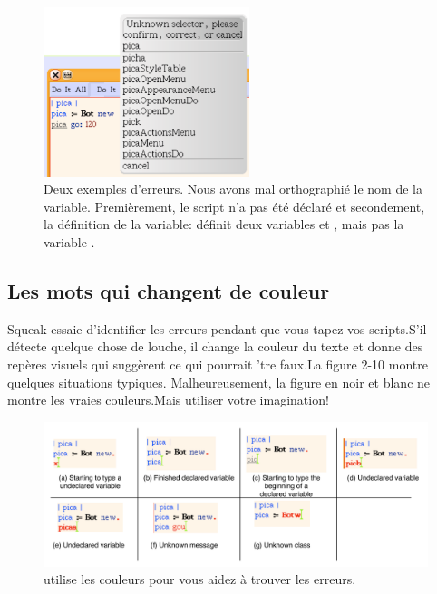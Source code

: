 \documentclass[a4paper,10pt,twoside]{book}
\begin{document}
\begin{figure}[h!]
\begin{center}\includegraphics[width=6cm]{periodMissing}
\caption{Deux exemples d'erreurs. Nous avons mal orthographi\'e le nom de la variable. Premi\`erement, le script  n'a pas \'et\'e d\'eclar\'e et secondement, la d\'efinition de la variable:  d\'efinit deux variables  et , mais pas la variable . \label{fig:periodMissing}}\end{center}
\end{figure}


\subsection{Les mots qui changent de couleur}

Squeak essaie d'identifier les erreurs pendant que vous tapez vos scripts.S'il d\'etecte quelque chose de louche, il change la couleur du texte et donne des rep\`eres visuels qui sugg\`erent ce qui pourrait 'tre faux.La figure 2-10 montre quelques situations typiques. Malheureusement, la figure en noir et blanc ne montre les vraies couleurs.Mais utiliser votre imagination!

\begin{figure}[h!]
\begin{center}\includegraphics[width=12cm]{coloring}
\caption{\sq utilise les couleurs pour vous aidez \`a trouver les erreurs. \label{fig:coloring}}\end{center}
\end{figure} 
\end{document}
